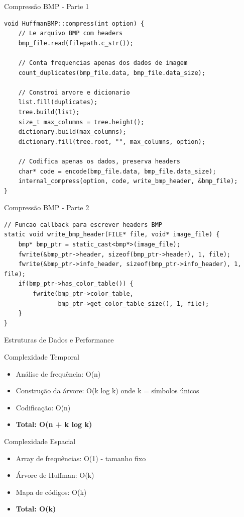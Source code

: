 \documentclass{beamer}
\begin{document}
\begin{frame}[fragile]{Compressão BMP - Parte 1}
    \begin{lstlisting}[style=CStyle, caption=Leitura e análise de frequências]
void HuffmanBMP::compress(int option) {
    // Le arquivo BMP com headers
    bmp_file.read(filepath.c_str());
    
    // Conta frequencias apenas dos dados de imagem
    count_duplicates(bmp_file.data, bmp_file.data_size);
    
    // Constroi arvore e dicionario
    list.fill(duplicates);
    tree.build(list);
    size_t max_columns = tree.height();
    dictionary.build(max_columns);
    dictionary.fill(tree.root, "", max_columns, option);

    // Codifica apenas os dados, preserva headers
    char* code = encode(bmp_file.data, bmp_file.data_size);
    internal_compress(option, code, write_bmp_header, &bmp_file);
}
    \end{lstlisting}
\end{frame}

\begin{frame}[fragile]{Compressão BMP - Parte 2}
    \begin{lstlisting}[style=CStyle, caption=Codificação e salvamento]
// Funcao callback para escrever headers BMP
static void write_bmp_header(FILE* file, void* image_file) {
    bmp* bmp_ptr = static_cast<bmp*>(image_file);
    fwrite(&bmp_ptr->header, sizeof(bmp_ptr->header), 1, file);
    fwrite(&bmp_ptr->info_header, sizeof(bmp_ptr->info_header), 1, file);
    if(bmp_ptr->has_color_table()) {
        fwrite(bmp_ptr->color_table, 
               bmp_ptr->get_color_table_size(), 1, file);
    }
}
    \end{lstlisting}
\end{frame}

\begin{frame}{Estruturas de Dados e Performance}
    \begin{block}{Complexidade Temporal}
        \begin{itemize}
            \item Análise de frequência: O(n)
            \item Construção da árvore: O(k log k) onde k = símbolos únicos
            \item Codificação: O(n)
            \item \textbf{Total: O(n + k log k)}
        \end{itemize}
    \end{block}
    \begin{block}{Complexidade Espacial}
        \begin{itemize}
            \item Array de frequências: O(1) - tamanho fixo
            \item Árvore de Huffman: O(k)
            \item Mapa de códigos: O(k)
            \item \textbf{Total: O(k)}
        \end{itemize}
    \end{block}
\end{frame}
\end{document}
